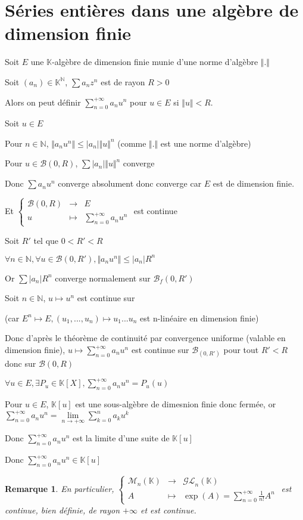 \documentclass[a4paper,12pt]{book}
\newcommand{\Def}[2]{\begin{tcolorbox}[sharp corners, colback=white,colframe=blue!90!black!75, title=Définition : #1]#2\end{tcolorbox}}
\newcommand{\Prop}[2]{\begin{tcolorbox}[sharp corners, colback=white,colframe=red!90!black!75, title=Proposition : #1]#2\end{tcolorbox}}
\newcommand{\Pre}[1]{\begin{tcolorbox}[sharp corners, colback=white,colframe=green!60!green!30!black!75, title=Preuve]#1\end{tcolorbox}}
\newtheorem{Rem}{Remarque}[section]
\def\N{\mathbb{N}}
\def\K{\mathbb{K}}
\begin{document}
\section{Séries entières dans une algèbre de dimension finie}
\Def{}{Soit $E$ une $\K$-algèbre de dimension finie munie d'une norme d'algèbre $\Vert.\Vert$
\par Soit $(a_n)\in\K^\N$, $\sum a_nz^n$ est de rayon $R>0$
\par Alors on peut définir $\sum\limits_{n=0}^{+\infty}a_nu^n$ pour $u\in E$ si $\Vert u\Vert < R$.}
\Pre{Soit $u\in E$ \par Pour $n\in\N$, $\Vert a_n u^n\Vert \leq \vert a_n\vert \Vert u\Vert^n$ (comme $\Vert.\Vert$ est une norme d'algèbre)
\par Pour $u\in \mathcal{B}(0,R)$, $\sum\vert a_n\vert\Vert u\Vert^n$ converge \par Donc $\sum a_nu^n$ converge absolument donc converge car $E$ est de dimension finie.}
\Prop{}{Et $\left\{\begin{array}{rcl} \mathcal{B}(0,R) & \to & E \\ u & \mapsto & \sum\limits_{n=0}^{+\infty} a_nu^n\end{array}\right.$ est continue}
\Pre{Soit $R'$ tel que $0<R'<R$ \par $\forall n\in\N, \forall u\in\mathcal{B}(0,R'), \Vert a_nu^n\Vert \leq \vert a_n\vert R^n$ \par Or $\sum \vert a_n\vert R^n$ converge normalement sur $\mathcal{B}_f(0, R')$
\par Soit $n\in\N$, $u\mapsto u^n$ est continue sur \par (car $E^n\mapsto E, (u_1,...,u_n)\mapsto u_1...u_n$ est n-linéaire en dimension finie) \par Donc d'après le théorème de continuité par convergence uniforme (valable en dimension finie), $u\mapsto \sum\limits_{n=0}^{+\infty}a_nu^n$ est continue sur $\mathcal{B}_(0,R')$ pour tout $R'<R$ donc sur $\mathcal{B}(0,R)$}
\Prop{}{$\forall u\in E, \exists P_u\in \K[X], \sum\limits_{n=0}^{+\infty}a_n u^n = P_u(u)$}
\Pre{Pour $u\in E$, $\K[u]$ est une sous-algèbre de dimesnion finie donc fermée, or $\sum\limits_{n=0}^{+\infty}a_nu^n = \lim\limits_{n\to+\infty}\sum\limits_{k=0}^na_ku^k$ \par Donc $\sum\limits_{n=0}^{+\infty}a_nu^n$ est la limite d'une suite de $\K[u]$ \par Donc $\sum\limits_{n=0}^{+\infty}a_nu^n\in \K[u]$}
\begin{Rem}
En particulier, $\left\{\begin{array}{rcl}\mathcal{M}_n(\K) & \to & \mathcal{GL}_n(\K) \\ A & \mapsto & \exp(A) = \sum\limits_{n=0}^{+\infty} \frac{1}{n!}A^n\end{array}\right.$ est continue, bien définie, de rayon $+\infty$ et est continue. 
\end{Rem}
\end{document}
